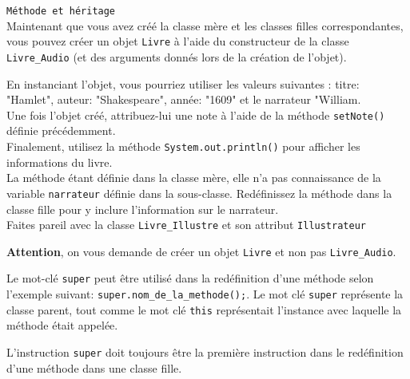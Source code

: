 \begin{Exercice}[5 minutes] \lstinline{Méthode et héritage} \\

Maintenant que vous avez créé la classe mère et les classes filles correspondantes, vous pouvez créer un objet \lstinline{Livre} à l'aide du constructeur de la classe \lstinline{Livre_Audio} (et des arguments donnés lors de la création de l'objet).


En instanciant l'objet, vous pourriez utiliser les valeurs suivantes : titre: "Hamlet", auteur: "Shakespeare", année: "1609" et le narrateur "William.\\

Une fois l'objet créé, attribuez-lui une note à l'aide de la méthode \lstinline{setNote()} définie précédemment.\\ 

Finalement, utilisez la méthode \lstinline{System.out.println()} pour afficher les informations du livre.\\

La méthode étant définie dans la classe mère, elle n'a pas connaissance de la variable \lstinline{narrateur} définie dans la sous-classe. Redéfinissez la méthode dans la classe fille pour y inclure l'information sur le narrateur. \\

Faites pareil avec la classe \lstinline{Livre_Illustre} et son attribut \lstinline{Illustrateur}

\begin{conseil}
\textbf{Attention}, on vous demande de créer un objet \lstinline{Livre} et non pas \lstinline{Livre_Audio}.

Le mot-clé \lstinline{super} peut être utilisé dans la redéfinition d'une méthode selon l'exemple suivant: \lstinline{super.nom_de_la_methode();}. Le mot clé \lstinline{super} représente la classe parent, tout comme le mot clé \lstinline{this} représentait l'instance avec laquelle la méthode était appelée. 


L'instruction \lstinline{super} doit toujours être la première instruction dans le redéfinition d'une méthode dans une classe fille. 
\end{conseil}

\begin{solution}
	
	
\end{solution}

\end{Exercice}

